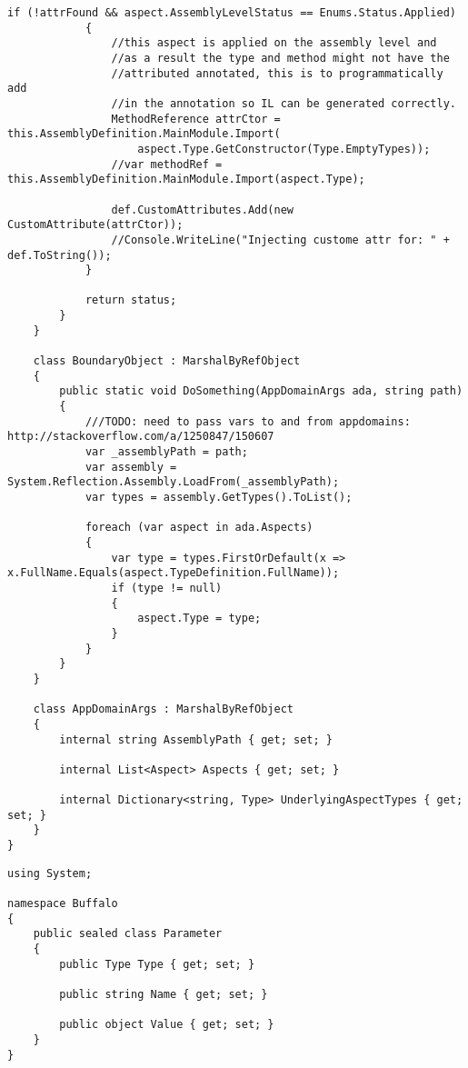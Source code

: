 \begin{lstlisting}[caption={../buffalo/Weaver.cs}, label=../buffalo/Weaver.cs, frame=tb, basicstyle=\scriptsize]
            if (!attrFound && aspect.AssemblyLevelStatus == Enums.Status.Applied)
            {
                //this aspect is applied on the assembly level and
                //as a result the type and method might not have the
                //attributed annotated, this is to programmatically add
                //in the annotation so IL can be generated correctly.
                MethodReference attrCtor = this.AssemblyDefinition.MainModule.Import(
                    aspect.Type.GetConstructor(Type.EmptyTypes));
                //var methodRef = this.AssemblyDefinition.MainModule.Import(aspect.Type);
                
                def.CustomAttributes.Add(new CustomAttribute(attrCtor));
                //Console.WriteLine("Injecting custome attr for: " + def.ToString());
            }

            return status;
        }
    }

    class BoundaryObject : MarshalByRefObject
    {
        public static void DoSomething(AppDomainArgs ada, string path)
        {
            ///TODO: need to pass vars to and from appdomains: http://stackoverflow.com/a/1250847/150607
            var _assemblyPath = path;
            var assembly = System.Reflection.Assembly.LoadFrom(_assemblyPath);
            var types = assembly.GetTypes().ToList();

            foreach (var aspect in ada.Aspects)
            {
                var type = types.FirstOrDefault(x => x.FullName.Equals(aspect.TypeDefinition.FullName));
                if (type != null)
                {
                    aspect.Type = type;
                }
            }
        }
    }

    class AppDomainArgs : MarshalByRefObject
    {
        internal string AssemblyPath { get; set; }

        internal List<Aspect> Aspects { get; set; }

        internal Dictionary<string, Type> UnderlyingAspectTypes { get; set; }
    }
}\end{lstlisting}

\begin{lstlisting}[caption={../buffalo/Parameter.cs}, label=../buffalo/Parameter.cs, frame=tb, basicstyle=\scriptsize]﻿using System;

namespace Buffalo
{
    public sealed class Parameter
    {
        public Type Type { get; set; }

        public string Name { get; set; }

        public object Value { get; set; }
    }
}
\end{lstlisting}

